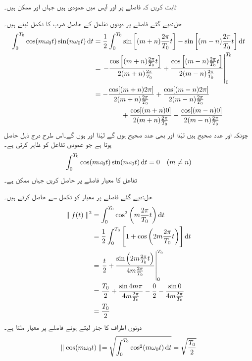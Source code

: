 ثابت کریں کہ  فاصلے پر  اور  آپس میں عمودی ہیں جہاں  اور  ممکن ہیں۔

حل:دیے گئے فاصلے پر دونوں تفاعل کے حاصل ضرب کا تکمل لیتے ہیں۔
\begin{align*}
\int_0^{T_0} \cos (m\omega_0 t) \sin (n\omega_0 t) \dif t&=\frac{1}{2}\int_0^{T_0} \sin\left[(m+n)\frac{2\pi}{T_0} t\right]-\sin\left[(m-n)\frac{2\pi}{T_0} t\right]\dif t\\
&=\left.-\frac{\cos\left[(m+n)\frac{2\pi}{T_0} t\right]}{2(m+n)\frac{2\pi}{T_0}}+\frac{\cos\left[(m-n)\frac{2\pi}{T_0} t\right]}{2(m-n)\frac{2\pi}{T_0}}\right|_0^{T_0}\\
&=-\frac{\cos[(m+n)2\pi]}{2(m+n)\frac{2\pi}{T_0}}+\frac{\cos[(m-n)2\pi]}{2(m-n)\frac{2\pi}{T_0}}\\
&\quad \quad \quad \quad +\frac{\cos[(m+n)0]}{2(m+n)\frac{2\pi}{T_0}}-\frac{\cos[(m-n)0]}{2(m-n)\frac{2\pi}{T_0}}
\end{align*}
چونکہ  اور  عدد صحیح ہیں لہٰذا  اور  بھی عدد صحیح ہوں گے لہٰذا  اور   ہوں گے۔اس طرح درج ذیل حاصل ہوتا ہے جو عمودی تفاعل کو ظاہر کرتی ہے۔
\begin{align}\label{مساوات_فوریئر_مختلف_تکمل_پ}
\int_0^{T_0} \cos (m\omega_0 t) \sin (n\omega_0 t) \dif t=0\quad (m\ne n)
\end{align}
تفاعل  کا معیار  فاصلے پر حاصل کریں جہاں   ممکن ہے۔ 

حل:دیے گئے فاصلے پر معیار کو تکمل سے حاصل کرتے ہیں۔
\begin{align*}
\parallel f(t) \parallel^2&=\int_0^{T_0} \cos^2 \left(m\frac{2\pi}{T_0} t\right) \dif t\\
&=\frac{1}{2}\int_0^{T_0}\left[ 1+\cos \left(2m\frac{2\pi}{T_0} t\right)\right] \dif t\\
&=\left. \frac{t}{2}+\frac{\sin \left(2m\frac{2\pi}{T_0} t\right)}{4m\frac{2\pi}{T_0}}\right|_0^{T_0}\\
&=\frac{T_0}{2}+\frac{\sin 4m\pi}{4m\frac{2\pi}{T_0}}-\frac{0}{2}-\frac{\sin 0}{4m\frac{2\pi}{T_0}}\\
&=\frac{T_0}{2}
\end{align*}
دونوں اطراف کا جذر لیتے ہوئے   فاصلے پر معیار ملتا ہے۔
\begin{align}\label{مساوات_فوریئر_مختلف_تکمل_ت}
\parallel \cos (m\omega_0 t) \parallel =\sqrt{\int_0^{T_0} \cos^2  (m\omega_0 t) \dif t}=\sqrt{\frac{T_0}{2}}
\end{align}

